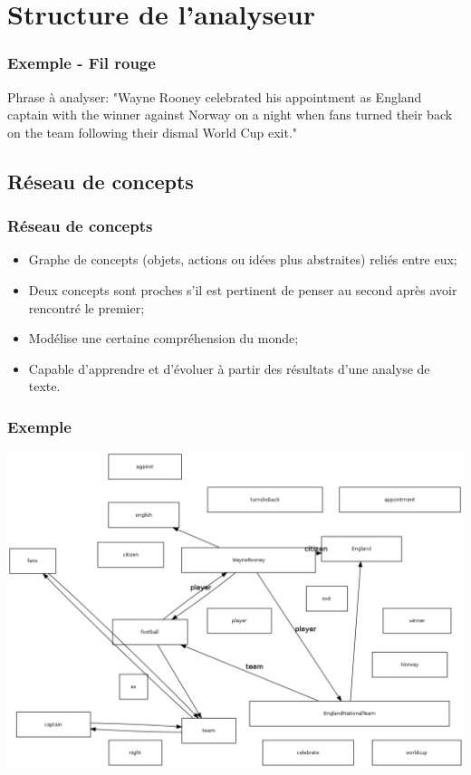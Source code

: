 \documentclass{beamer}
\begin{document}
\section{Structure de l'analyseur}%
    \begin{frame}
        \frametitle{Exemple - Fil rouge}
        Phrase à analyser:\newline{}
        "Wayne Rooney celebrated his appointment as England captain with the winner against Norway on a night when
        fans turned their back on the team following their dismal World Cup exit."
    \end{frame}

    \subsection{Réseau de concepts}
        \begin{frame}
        \frametitle{Réseau de concepts}
            \begin{itemize}
                \item Graphe de concepts (objets, actions ou idées plus abstraites) reliés entre eux;
                \item Deux concepts sont proches s'il est pertinent de penser au second après avoir rencontré le premier;
                \item Modélise une certaine compréhension du monde;
                \item Capable d'apprendre et d'évoluer à partir des résultats d'une analyse de texte.
            \end{itemize}
        \end{frame}

        \begin{frame}
        \frametitle{Exemple}
            \includegraphics[height=0.8\textheight]{RC/figures/RCetape0.png}
        \end{frame}
\end{document}
